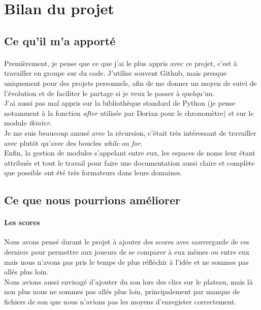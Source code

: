 \documentclass[12pt, a4paper]{article}
\begin{document}

\newpage

\section{Bilan du projet}

\subsection{Ce qu'il m'a apporté}

\paragraph{}
Premièrement, je pense que ce que j'ai le plus appris avec ce projet, c'est à
travailler en groupe sur du code. J'utilise souvent Github, mais presque
uniquement pour des projets personnels, afin de me donner un moyen de suivi de
l'évolution et de faciliter le partage si je veux le passer à quelqu'un. \\
J'ai aussi pas mal appris sur la bibliothèque standard de Python (je pense
notamment à la fonction \emph{after} utilisée par Dorian pour le chronomètre)
et sur le module \emph{tkinter}. \\
Je me suis beaucoup amusé avec la récursion, c'était très intéressant de
travailler avec plutôt qu'avec des boucles \emph{while} ou \emph{for}. \\
Enfin, la gestion de modules s'appelant entre eux, les espaces de noms leur
étant attribués et tout le travail pour faire une documentation aussi claire
et complète que possible ont été très formateurs dans leurs domaines.


\subsection{Ce que nous pourrions améliorer}

\paragraph{Les scores}
Nous avons pensé durant le projet à ajouter des scores avec sauvergarde de ces
derniers pour permettre aux joueurs de se comparer à eux mêmes ou entre eux
mais nous n'avons pas pris le temps de plus réfléchir à l'idée et ne sommes pas
allés plus loin. \\
Nous avions aussi envisagé d'ajouter du son lors des clics sur le plateau, mais
là non plus nous ne sommes pas allés plus loin, principalement par manque de
fichiers de son que nous n'avions pas les moyens d'enregister correctement. \\
\end{document}
